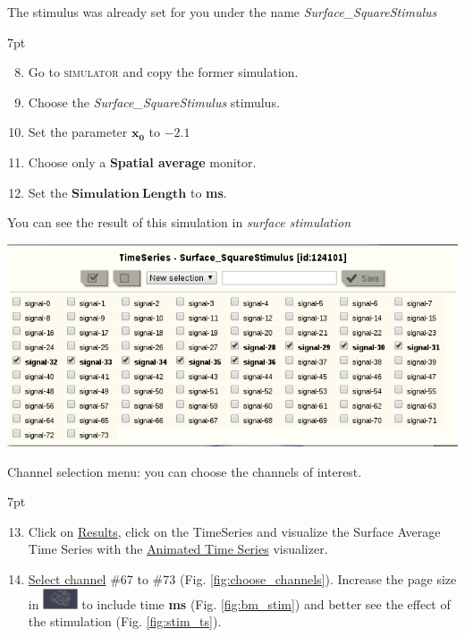 \documentclass{tufte-handout}
\newenvironment{simulation}{%
  \def\FrameCommand{%
    \hspace{1pt}%
    {\color{ForestGreen}\vrule width 2pt}%
    {\color{simulationshade}\vrule width 4pt}%
    \colorbox{simulationshade}%
  }%
  \MakeFramed{\advance\hsize-\width\FrameRestore}%
  \noindent\hspace{-4.55pt}%
  \begin{adjustwidth}{}{7pt}%
  \vspace{2pt}\vspace{2pt}%
}
{%
  \vspace{2pt}\end{adjustwidth}\endMakeFramed%
}
\begin{document}
The stimulus was already set for you under the name \textit{Surface\_SquareStimulus}

  \begin{simulation}
  \begin{enumerate}
  \setcounter{enumi}{7}
  \item Go to \textsc{simulator} and copy the former simulation.
  \item Choose the \textit{Surface\_SquareStimulus} stimulus.
  \item Set the parameter $\mathbf{x_0}$ to $\mathbf{-2.1}$
  \item Choose only a \textbf{Spatial average} monitor.
  \item Set the $\mathbf{Simulation\:Length}$ to \textbf{\unit[4000]{ms}}.
 
\end{enumerate}
\end{simulation}


You can see the result of this simulation in \textit{surface stimulation}

\begin{marginfigure}
  \includegraphics[width=\linewidth]{Handout_UI_ModellingAnEpilepticPatient_ChooseChannelsStimulation}%
  \caption{Channel selection menu: you can choose the channels of interest. }%
  \label{fig:choose_channels}%
\end{marginfigure}


  \begin{simulation}
  \begin{enumerate}
  \setcounter{enumi}{12}
  \item Click on \underline{Results}, click on the TimeSeries and visualize the Surface Average Time Series with 
  the \underline{Animated Time Series} visualizer.
  \item \underline{Select channel} \#67 to \#73 (Fig. \ref{fig:choose_channels}). Increase the page size in \includegraphics[width=0.08\textwidth]{butt_brain_menu} to include time \textbf{\unit[2000]{ms}}
  (Fig. \ref{fig:bm_stim}) and better see the effect of the stimulation (Fig. \ref{fig:stim_ts}).
 
\end{enumerate}
\end{simulation}
\end{document}
